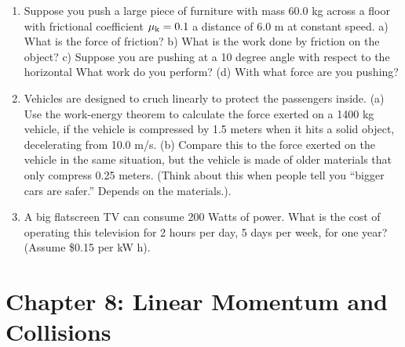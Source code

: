 \documentclass[10pt]{article}
\begin{document}
\begin{enumerate}
\item Suppose you push a large piece of furniture with mass 60.0 kg across a floor with frictional coefficient $\mu_{\rm k} = 0.1$ a distance of 6.0 m at constant speed.  a) What is the force of friction?  b) What is the work done by friction on the object?  c) Suppose you are pushing at a 10 degree angle with respect to the horizontal What work do you perform? (d) With what force are you pushing? \\ \vspace{2.5cm}
\item  Vehicles are designed to cruch linearly to protect the passengers inside. (a) Use the work-energy theorem to calculate the force exerted on a 1400 kg vehicle, if the vehicle is compressed by 1.5 meters when it hits a solid object, decelerating from 10.0 m/s. (b) Compare this to the force exerted on the vehicle in the same situation, but the vehicle is made of older materials that only compress 0.25 meters. (Think about this when people tell you ``bigger cars are safer.''  Depends on the materials.).  \\ \vspace{3cm}
\item A big flatscreen TV can consume 200 Watts of power.  What is the cost of operating this television for 2 hours per day, 5 days per week, for one year?  (Assume \$0.15 per kW h). \\ \vspace{2cm}
\end{enumerate}

\section{Chapter 8: Linear Momentum and Collisions}
\end{document}
